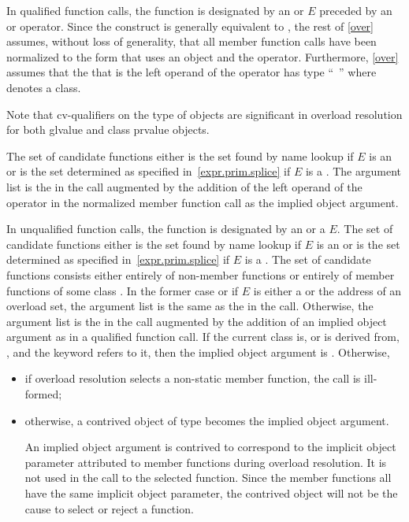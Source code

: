 \pnum
In qualified function calls,
the function is designated by
an  or  $E$
preceded by an \tcode{->} or  operator.
Since the
construct
is generally equivalent to
,
the rest of
\ref{over} assumes, without loss of generality, that all member
function calls have been normalized to the form that uses an
object and the
operator.
Furthermore, \ref{over} assumes that
the
that is the left operand of the
operator
has type ``\cv{}~''
where
denotes a class.
\begin{footnote}
Note that cv-qualifiers on the type of objects are
significant in overload
resolution for
both glvalue and class prvalue objects.
\end{footnote}
The set of candidate functions either
is the set found by name lookup
if $E$ is an  or
is the set determined as specified in~\ref{expr.prim.splice}
if $E$ is a .
The argument list is the
in the call augmented by the addition of the left operand of
the
operator in the normalized member function call as the
implied object argument.

\pnum
In unqualified function calls, the function is designated by
an  or a  $E$.
The set of candidate functions either
is the set found by name lookup
if $E$ is an  or
is the set determined as specified in~\ref{expr.prim.splice}
if $E$ is a .
The set of candidate functions
consists either entirely of non-member functions or entirely of
member functions of some class
.
In the former case or
if $E$ is either a  or
the address of an overload set,
the argument list is
the same as the
in the call.
Otherwise, the argument list is the
in the call augmented by the addition of an implied object
argument as in a qualified function call.
If the current class is, or is derived from, , and the keyword
 refers to it,
then the implied object argument is .
Otherwise,
\begin{itemize}
\item
if overload resolution selects a non-static member function,
the call is ill-formed;
\item
otherwise,
a contrived object of type
becomes the implied object argument.
\begin{footnote}
An implied object argument is contrived to
correspond to the implicit object
parameter attributed to member functions during overload resolution.
It is not
used in
the call to the selected function.
Since the member functions all have the
same implicit
object parameter, the contrived object will not be the cause to select or
reject a
function.
\end{footnote}
\end{itemize}

